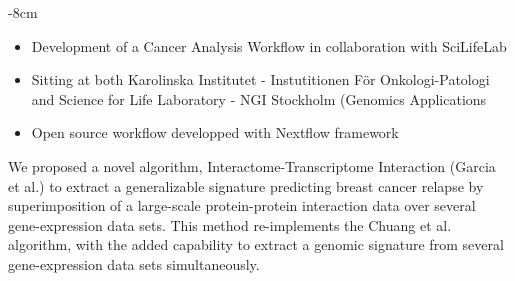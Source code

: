 \documentclass[10pt,a4paper,academicons]{altacv}
\begin{document}

\begin{adjustwidth}{}{-8cm}
\makecvheader
\end{adjustwidth}


\begin{itemize}
\item Development of a Cancer Analysis Workflow in collaboration with SciLifeLab
\item Sitting at both Karolinska Institutet - Instutitionen För Onkologi-Patologi and Science for Life Laboratory - NGI Stockholm (Genomics Applications
\end{itemize}

\divider


\begin{itemize}
\item Open source workflow developped with Nextflow framework
\end{itemize}

\divider

We proposed a novel algorithm, Interactome-Transcriptome Interaction (Garcia et al.) to extract a generalizable signature predicting breast cancer relapse by superimposition of a large-scale protein-protein interaction data over several gene-expression data sets. This method re-implements the Chuang et al. algorithm, with the added capability to extract a genomic signature from several gene-expression data sets simultaneously.
\end{document}
